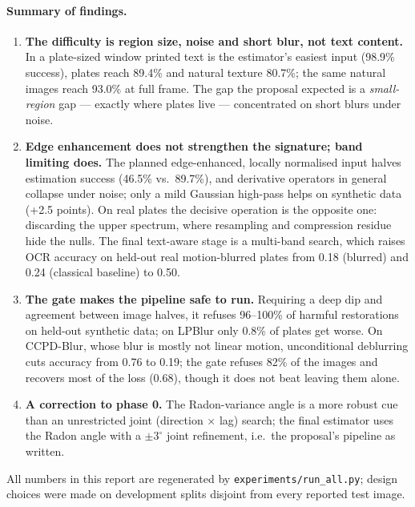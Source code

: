 \paragraph{Summary of findings.}
\begin{enumerate}
  \item \textbf{The difficulty is region size, noise and short blur, not text content.}
        In a plate-sized window printed text is the estimator's easiest input (98.9\% success),
        plates reach 89.4\% and natural texture 80.7\%; the same natural images reach 93.0\% at full
        frame. The gap the proposal expected is a \emph{small-region} gap --- exactly where plates
        live --- concentrated on short blurs under noise.
  \item \textbf{Edge enhancement does not strengthen the signature; band limiting does.} The planned
        edge-enhanced, locally normalised input halves estimation success (46.5\% vs.\ 89.7\%), and
        derivative operators in general collapse under noise; only a mild Gaussian high-pass helps on
        synthetic data (+2.5 points). On real plates the decisive operation is the opposite one:
        discarding the upper spectrum, where resampling and compression residue hide the nulls. The
        final text-aware stage is a multi-band search, which raises OCR accuracy on held-out real
        motion-blurred plates from 0.18 (blurred) and 0.24 (classical baseline) to 0.50.
  \item \textbf{The gate makes the pipeline safe to run.} Requiring a deep dip and agreement between
        image halves, it refuses 96--100\% of harmful restorations on held-out synthetic data; on
        LPBlur only 0.8\% of plates get worse. On CCPD-Blur, whose blur is mostly not linear motion,
        unconditional deblurring cuts accuracy from 0.76 to 0.19; the gate refuses 82\% of the
        images and recovers most of the loss (0.68), though it does not beat leaving them alone.
  \item \textbf{A correction to phase 0.} The Radon-variance angle is a more robust cue than an
        unrestricted joint (direction $\times$ lag) search; the final estimator uses the Radon angle
        with a $\pm3^\circ$ joint refinement, i.e.\ the proposal's pipeline as written.
\end{enumerate}
All numbers in this report are regenerated by \texttt{experiments/run\_all.py}; design choices were
made on development splits disjoint from every reported test image.
